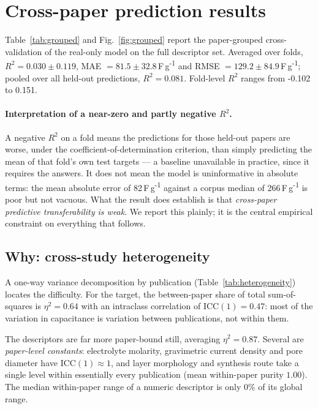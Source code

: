 \section{Cross-paper prediction results}\label{sec:grouped}

Table~\ref{tab:grouped} and Fig.~\ref{fig:grouped} report the paper-grouped
cross-validation of the real-only model on the full descriptor set. Averaged over folds,
$R^2 = 0.030 \pm 0.119$,
MAE $= 81.5 \pm 32.8$\,F\,g\textsuperscript{-1} and
RMSE $= 129.2 \pm 84.9$\,F\,g\textsuperscript{-1};
pooled over all held-out predictions, $R^2 = 0.081$.
Fold-level $R^2$ ranges from -0.102 to 0.151.

\paragraph{Interpretation of a near-zero and partly negative $R^2$.}
A negative $R^2$ on a fold means the predictions for those held-out papers are worse, under
the coefficient-of-determination criterion, than simply predicting the mean of that fold's
own test targets --- a baseline unavailable in practice, since it requires the answers. It
does not mean the model is uninformative in absolute terms: the mean absolute error of
82\,F\,g\textsuperscript{-1} against a corpus median of
266\,F\,g\textsuperscript{-1} is poor but not vacuous.
What the result does establish is that \emph{cross-paper predictive transferability is
weak}. We report this plainly; it is the central empirical constraint on everything that
follows.

\subsection{Why: cross-study heterogeneity}\label{sec:domainshift}

A one-way variance decomposition by publication (Table~\ref{tab:heterogeneity}) locates the
difficulty. For the target, the between-paper share of total sum-of-squares is
$\eta^2 = 0.64$ with an intraclass correlation of ICC$(1) = 0.47$: most of
the variation in capacitance is variation between publications, not within them.

The descriptors are far more paper-bound still, averaging
$\eta^2 = 0.87$. Several are \emph{paper-level constants}:
electrolyte molarity, gravimetric current density and pore diameter have
ICC$(1) \approx 1$, and layer morphology and synthesis route take a single level within
essentially every publication (mean within-paper purity $1.00$). The median within-paper
range of a numeric descriptor is only
0\% of its global range.

